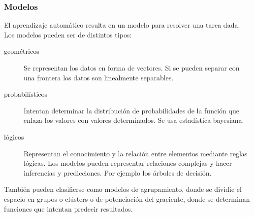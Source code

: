     \subsubsection{Modelos}
        El aprendizaje automático resulta en un modelo para resolver una tarea dada. Los modelos pueden ser de distintos tipos:
        \begin{description}
            \item[geométricos] Se representan los datos en forma de vectores. Si se pueden separar con una frontera los datos son linealmente separables.
            \item[probabilísticos] Intentan determinar la distribución de probabilidades de la función que enlaza los valores con valores determinados. Se usa estadística bayesiana.
            \item[lógicos] Representan el conocimiento y la relación entre elementos mediante reglas lógicas. Los modelos pueden representar relaciones complejas y hacer inferencias y predicciones. Por ejemplo los árboles de decisión.
        \end{description}
        También pueden clasificrse como modelos de agrupamiento, donde se dividie el espacio en grupos o clústers o de potenciación del graciente, donde se determinan funciones que intentan predecir resultados.

